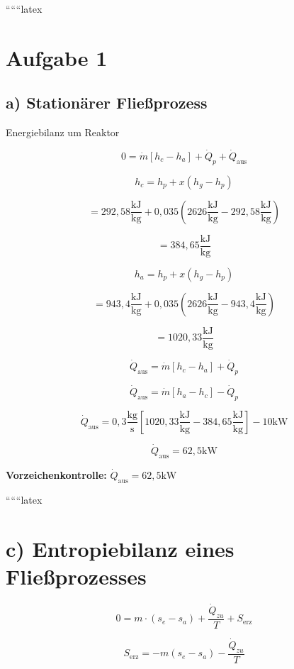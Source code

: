 
``````latex


\section*{Aufgabe 1}

\subsection*{a) Stationärer Fließprozess}

Energiebilanz um Reaktor

\[
0 = \dot{m} \left[ h_c - h_a \right] + \dot{Q}_p + \dot{Q}_{\text{aus}}
\]

\[
h_c = h_{p} + x \left( h_{g} - h_{p} \right)
\]

\[
= 292,58 \frac{\text{kJ}}{\text{kg}} + 0,035 \left( 2626 \frac{\text{kJ}}{\text{kg}} - 292,58 \frac{\text{kJ}}{\text{kg}} \right)
\]

\[
= 384,65 \frac{\text{kJ}}{\text{kg}}
\]

\[
h_a = h_{p} + x \left( h_{g} - h_{p} \right)
\]

\[
= 943,4 \frac{\text{kJ}}{\text{kg}} + 0,035 \left( 2626 \frac{\text{kJ}}{\text{kg}} - 943,4 \frac{\text{kJ}}{\text{kg}} \right)
\]

\[
= 1020,33 \frac{\text{kJ}}{\text{kg}}
\]

\[
\dot{Q}_{\text{aus}} = \dot{m} \left[ h_c - h_a \right] + \dot{Q}_p
\]

\[
\dot{Q}_{\text{aus}} = \dot{m} \left[ h_a - h_c \right] - \dot{Q}_p
\]

\[
\dot{Q}_{\text{aus}} = 0,3 \frac{\text{kg}}{\text{s}} \left[ 1020,33 \frac{\text{kJ}}{\text{kg}} - 384,65 \frac{\text{kJ}}{\text{kg}} \right] - 10 \text{kW}
\]

\[
\dot{Q}_{\text{aus}} = 62,5 \text{kW}
\]

\textbf{Vorzeichenkontrolle:} \underline{$\dot{Q}_{\text{aus}} = 62,5 \text{kW}$}

``````latex


\section*{c) Entropiebilanz eines Fließprozesses}

\[
0 = m \cdot \left( s_e - s_a \right) + \frac{\dot{Q}_{zu}}{T} + S_{\text{erz}}
\]

\[
S_{\text{erz}} = -m \left( s_e - s_a \right) - \frac{\dot{Q}_{zu}}{T}
\]

